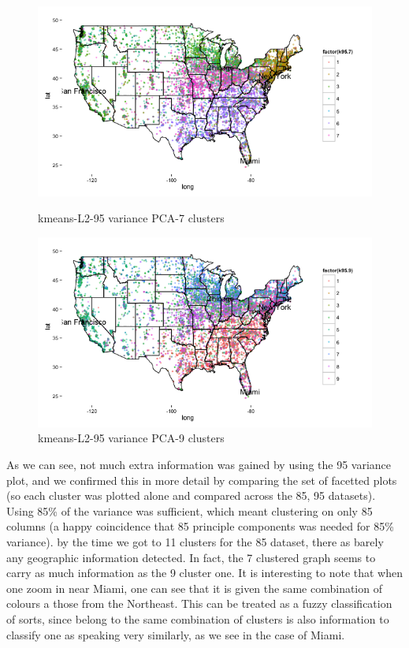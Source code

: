 \documentclass{article}\usepackage[]{graphicx}\usepackage[]{color}
\begin{document}
\begin{figure}
\begin{minipage}{.5\textwidth}
\includegraphics[width=250pts, height=150pts]{95_7.png}
\caption{kmeans-L2-95 variance PCA-7 clusters}
\end{minipage}
\begin{minipage}{.5\textwidth}
\includegraphics[width=250pts, height=150pts]{95_9.png}
\caption{kmeans-L2-95 variance PCA-9 clusters}
\end{minipage}

\end{figure}


As we can see, not much extra information was gained by using the 95 variance plot, and we confirmed this in more detail by comparing the set of facetted plots (so each cluster was plotted alone and compared across the 85, 95 datasets). Using 85\% of the variance was sufficient, which meant clustering on only 85 columns (a happy coincidence that 85 principle components was needed for 85\% variance).  by the time we got to 11 clusters for the 85 dataset, there as barely any geographic information detected.  In fact, the 7 clustered graph seems to carry as much information as the 9 cluster one.  It is interesting to note that when one zoom in near Miami, one can see that it is given the same combination of colours a those from the Northeast. This can be treated as a fuzzy classification of sorts, since belong to the same combination of clusters is also information to classify one as speaking very similarly, as we see in the case of Miami. \\
\end{document}
